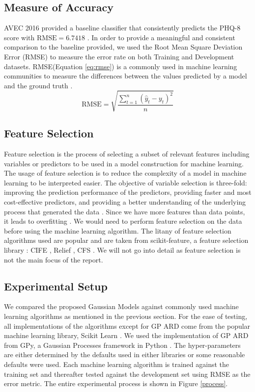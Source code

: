 \documentclass{article}
\begin{document}
 	\subsection{Measure of Accuracy}
	AVEC 2016 provided a baseline classifier that consistently predicts the PHQ-8 score with $\text{RMSE}=6.7418$ \cite{avec2016}. 
	In order to provide a meaningful and consistent comparison to the baseline provided, we used the Root Mean Square Deviation Error (RMSE) to measure the error rate on both Training and Development datasets. 
	RMSE(Equation \ref{eq:rmse}) is a commonly used in machine learning communities to measure the differences between the values predicted by a model 
	and the ground truth \cite{Dhanani:EECS-2014-131}. 
	\begin{equation}\label{eq:rmse}
  	\text{RMSE} = \sqrt{\frac{\sum_{t=1}^n (\hat y_t - y_t)^2}{n}}
 	\end{equation} 

	\subsection{Feature Selection}
	Feature selection is the process of selecting a subset of relevant features including variables or predictors to be used in a model construction for machine learning. 
	The usage of feature selection is to reduce the complexity of a model in machine learning to be interpreted easier. 
	The objective of variable selection is three-fold: improving the prediction performance of the predictors, providing faster and most cost-effective predictors, 
	and providing a better understanding of the underlying process that generated the data \cite{Guyon2003}.
	Since we have more features than data points, it leads to overfitting \cite{Smith2011}. 
	We would need to perform feature selection on the data before using the machine learning algorithm. 
	The litany of feature selection algorithms used are popular and are taken from scikit-feature, a feature selection library \cite{li2016feature}: CIFE \cite{Lin2006}, Relief \cite{Rob2003}, CFS \cite{HALLHALL}. 
	We will not go into detail as feature selection is not the main focus of the report.
	
	\subsection{Experimental Setup}
	We compared the proposed Gaussian Models against commonly used machine learning algorithms as mentioned in the previous section. 
	For the ease of testing, all implementations of the algorithms except for GP ARD come from the popular machine learning library, Scikit Learn \cite{scikit-learn}. 
	We used the implementation of GP ARD from GPy, a Gaussian Processes framework in Python \cite{gpy2014}. 
	The hyper-parameters are either determined by the defaults used in either libraries or some reasonable defaults were used.
	Each machine learning algorithm is trained against the training set and thereafter tested against the development set using RMSE as the error metric. 
	The entire experimental process is shown in Figure \ref{process}. \\
 
\end{document}
